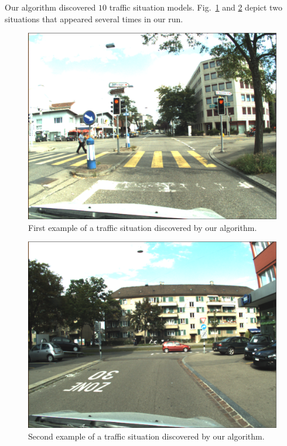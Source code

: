 Our algorithm discovered $10$ traffic situation models. Fig.~\ref{fig:place64}
and \ref{fig:place103} depict two situations that appeared several times in our
run.

\begin{figure}[t]
\centering
\includegraphics[width=\columnwidth]{fig/place64.eps}
\caption{First example of a traffic situation discovered by our algorithm.}
\label{fig:place64}
\end{figure}

\begin{figure}[t]
\centering
\includegraphics[width=\columnwidth]{fig/place103.eps}
\caption{Second example of a traffic situation discovered by our algorithm.}
\label{fig:place103}
\end{figure}
